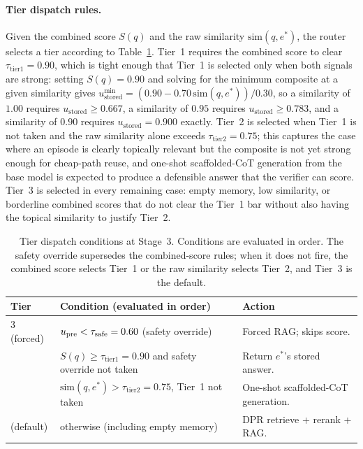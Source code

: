 \paragraph{Tier dispatch rules.}
Given the combined score $S(q)$ and the raw similarity $\mathrm{sim}(q, e^{*})$, the router selects a tier according to Table~\ref{tab:tier-thresholds}. Tier~1 requires the combined score to clear $\tau_{\text{tier1}} = 0.90$, which is tight enough that Tier~1 is selected only when both signals are strong: setting $S(q) = 0.90$ and solving for the minimum composite at a given similarity gives $u_{\text{stored}}^{\min} = (0.90 - 0.70\,\mathrm{sim}(q, e^{*})) / 0.30$, so a similarity of $1.00$ requires $u_{\text{stored}} \geq 0.667$, a similarity of $0.95$ requires $u_{\text{stored}} \geq 0.783$, and a similarity of $0.90$ requires $u_{\text{stored}} = 0.900$ exactly. Tier~2 is selected when Tier~1 is not taken and the raw similarity alone exceeds $\tau_{\text{tier2}} = 0.75$; this captures the case where an episode is clearly topically relevant but the composite is not yet strong enough for cheap-path reuse, and one-shot scaffolded-CoT generation from the base model is expected to produce a defensible answer that the verifier can score. Tier~3 is selected in every remaining case: empty memory, low similarity, or borderline combined scores that do not clear the Tier~1 bar without also having the topical similarity to justify Tier~2.

\begin{table}[tbp]
\centering
\caption{Tier dispatch conditions at Stage~3. Conditions are evaluated in order. The safety override supersedes the combined-score rules; when it does not fire, the combined score selects Tier~1 or the raw similarity selects Tier~2, and Tier~3 is the default.}
\label{tab:tier-thresholds}
\small
\begin{tabular}{@{}p{1.4cm}p{7.8cm}p{5.2cm}@{}}
\toprule
\textbf{Tier} & \textbf{Condition (evaluated in order)} & \textbf{Action} \\
\midrule
3 (forced) & $u_{\text{pre}} < \tau_{\text{safe}} = 0.60$ (safety override) & Forced RAG; skips score. \\
\addlinespace[2pt]
1          & $S(q) \geq \tau_{\text{tier1}} = 0.90$ and safety override not taken & Return $e^{*}$'s stored answer. \\
\addlinespace[2pt]
2          & $\mathrm{sim}(q, e^{*}) > \tau_{\text{tier2}} = 0.75$, Tier~1 not taken & One-shot scaffolded-CoT generation. \\
\addlinespace[2pt]
3 (default)& otherwise (including empty memory) & DPR retrieve + rerank + RAG. \\
\bottomrule
\end{tabular}
\end{table}


